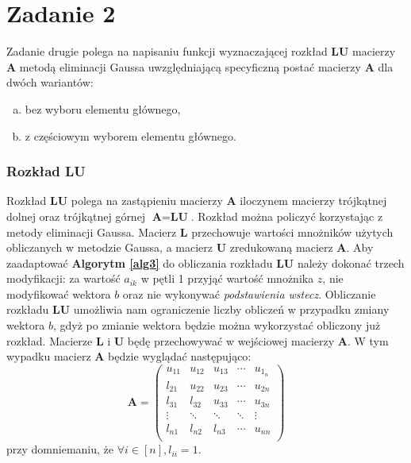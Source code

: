 \documentclass[12pt]{article}
\begin{document}
\section{Zadanie 2}
Zadanie drugie polega na napisaniu funkcji wyznaczającej rozkład \textbf{LU} macierzy \textbf{A} metodą eliminacji Gaussa uwzględniającą specyficzną postać macierzy \textbf{A} dla dwóch wariantów:
\begin{enumerate}[(a)]
	\item bez wyboru elementu głównego,
	\item z częściowym wyborem elementu głównego.
\end{enumerate}


\subsubsection*{Rozkład LU}
Rozkład \textbf{LU} polega na zastąpieniu macierzy \textbf{A} iloczynem macierzy trójkątnej dolnej oraz trójkątnej górnej $\textbf{A} = \textbf{L}\textbf{U}$. Rozkład można policzyć korzystając z metody eliminacji Gaussa. Macierz \textbf{L} przechowuje wartości mnożników użytych obliczanych w metodzie Gaussa, a macierz \textbf{U} zredukowaną macierz \textbf{A}. Aby zaadaptować \textbf{Algorytm \ref{alg3}} do obliczania rozkładu \textbf{LU} należy dokonać trzech modyfikacji: za wartość $a_{ik}$ w pętli 1 przyjąć wartość mnożnika $z$, nie modyfikować wektora $b$ oraz nie wykonywać \textit{podstawienia wstecz}. Obliczanie rozkładu \textbf{LU} umożliwia nam ograniczenie liczby obliczeń w przypadku zmiany wektora $b$, gdyż po zmianie wektora będzie można wykorzystać obliczony już rozkład. Macierze \textbf{L} i \textbf{U} będę przechowywać w wejściowej macierzy \textbf{A}. W tym wypadku macierz \textbf{A} będzie wyglądać następująco:
\begin{equation}
\textbf{A} = 
\begin{pmatrix}
u_{1 1} & u_{1 2} & u_{1 3} & \cdots & u_{1_n}\\
l_{2 1} & u_{2 2} & u_{2 3} & \cdots & u_{2 n}\\
l_{3 1} & l_{3 2} & u_{3 3} & \cdots & u_{3 n}\\
\vdots & \ddots & \ddots & \ddots & \vdots \\
l_{n 1} & l_{n 2} & l_{n 3} & \cdots & u_{n n}\\
\end{pmatrix}
\end{equation}
przy domniemaniu, że $\forall i \in [n], l_{ii}=1$.
\end{document}
